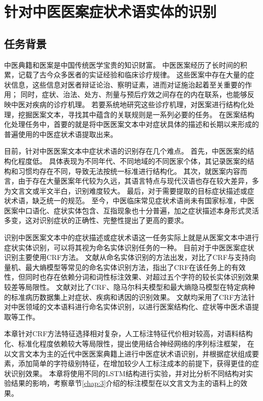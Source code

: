 \chapter{针对中医医案症状术语实体的识别}
\section{任务背景}
中医典籍和医案是中国传统医学宝贵的知识财富。
中医医案经历了长时间的积累，记载了古今众多医者的实证经验和临床诊疗规律。
这些医案中存在大量的症状信息，这些信息对医者辩证论治、察明证素，进而对证施治起着至关重要的作用；
同时，症状、治法、处方、剂量与预后疗效之间存在的内在联系，也能够反映中医对疾病的诊疗机理。
若要系统地研究这些诊疗机理，对医案进行结构化处理，挖掘医案文本，寻找其中蕴含的关联规则是一系列必要的任务。
在医案结构化处理任务中，首要的就是将中医医案文本中对症状具体的描述和长期以来形成的普遍使用的中医症状术语提取出来。

目前，针对中医医案文本中症状术语的识别存在几个难点。
首先，中医医案的结构化程度低。
具体表现为不同年代、不同地域的不同医家个体，其记录医案的结构和习惯均存在不同，导致无法按统一标准进行结构化。
其次，就医案内容而言，由于存在大量医案年代较为久远，其语言特点与现代汉语也存在较大差异，多为文言文或半文半白，识别难度较大。
最后，对于需要提取的目标症状描述或症状术语，缺乏统一的规范。
至今，中医临床常见症状术语尚未有国家标准，中医医案中口语化、症状实体包含、互指现象也十分普遍，加之症状描述本身形式灵活多变，这对识别症状的正确性、完整性提出了更高的要求。

识别中医医案文本中的症状描述或症状术语这一任务实际上就是从医案文本中进行症状实体识别，可以将其视为命名实体识别任务的一种。
目前对于中医医案症状识别主要使用CRF方法。
文献从命名实体识别的方法出发，对比了CRF与支持向量机、最大熵模型等常见的命名实体识别方法，指出了CRF在该任务上的有效性，但同时也存在依赖分词和词性标注效果、对超过五个字符的较长实体识别效果较差等局限性。
文献对比了CRF、隐马尔科夫模型和最大熵隐马模型在特定病种的标准病历数据集上对症状、疾病和诱因的识别效果。
文献均采用了CRF方法针对中医领域的文本语料进行命名实体识别，以进行医案结构化、症状等中医术语提取等工作。

本章针对CRF方法特征选择相对复杂，人工标注特征代价相对较高，对语料结构化、标准化程度依赖较大等局限性，提出使用结合神经网络的序列标注框架，
在以文言文本为主的近代中医医案典籍上进行中医症状术语识别，并根据症状组成要素，添加简单的字符级别特征，在增加较少人工标注成本的前提下，获得更佳的症状识别效果。
本章将使用不同的LSTM结构进行实验，并对比分析不同结构对实验结果的影响，考察章节\ref{chap:3}介绍的标注模型在以文言文为主的语料上的效果。

